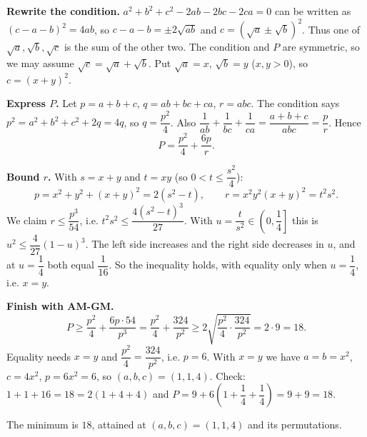 \textbf{Rewrite the condition.} $a^2+b^2+c^2-2ab-2bc-2ca=0$ can be written as $(c-a-b)^2=4ab$, so $c-a-b=\pm2\sqrt{ab}$ and $c=\left(\sqrt a\pm\sqrt b\right)^2$. Thus one of $\sqrt a,\sqrt b,\sqrt c$ is the sum of the other two. The condition and $P$ are symmetric, so we may assume $\sqrt c=\sqrt a+\sqrt b$. Put $\sqrt a=x$, $\sqrt b=y$ ($x,y>0$), so $c=(x+y)^2$.

\textbf{Express $P$.} Let $p=a+b+c$, $q=ab+bc+ca$, $r=abc$. The condition says $p^2=a^2+b^2+c^2+2q=4q$, so $q=\dfrac{p^2}{4}$. Also $\dfrac{1}{ab}+\dfrac{1}{bc}+\dfrac{1}{ca}=\dfrac{a+b+c}{abc}=\dfrac {p}{r}$. Hence
\[P=\dfrac{p^2}{4}+\dfrac{6p}{r}.\]

\textbf{Bound $r$.} With $s=x+y$ and $t=xy$ (so $0<t\le\dfrac{s^2}{4}$):
\[p=x^2+y^2+(x+y)^2=2\left(s^2-t\right),\qquad r=x^2y^2(x+y)^2=t^2s^2.\]
We claim $r\le\dfrac{p^3}{54}$, i.e. $t^2s^2\le\dfrac{4\left(s^2-t\right)^3}{27}$. With $u=\dfrac{t}{s^2}\in\left(0,\dfrac{1}{4}\right]$ this is $u^2\le\dfrac{4}{27}(1-u)^3$. The left side increases and the right side decreases in $u$, and at $u=\dfrac{1}{4}$ both equal $\dfrac{1}{16}$. So the inequality holds, with equality only when $u=\dfrac{1}{4}$, i.e. $x=y$.

\textbf{Finish with AM-GM.}
\[P\ge\dfrac{p^2}{4}+\dfrac{6p\cdot54}{p^3}=\dfrac{p^2}{4}+\dfrac{324}{p^2}\ge2\sqrt{\dfrac{p^2}{4}\cdot\dfrac{324}{p^2}}=2\cdot9=18.\]
Equality needs $x=y$ and $\dfrac{p^2}{4}=\dfrac{324}{p^2}$, i.e. $p=6$. With $x=y$ we have $a=b=x^2$, $c=4x^2$, $p=6x^2=6$, so $(a,b,c)=(1,1,4)$. Check: $1+1+16=18=2(1+4+4)$ and $P=9+6\left(1+\dfrac{1}{4}+\dfrac{1}{4}\right)=9+9=18$.

The minimum is $\boxed{18}$, attained at $(a,b,c)=(1,1,4)$ and its permutations.
